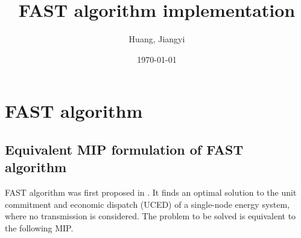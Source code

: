 \documentclass{article}
\title{FAST algorithm implementation}
\author{Huang, Jiangyi}
\date{\today}
\begin{document}
\maketitle

\section{FAST algorithm}

\subsection{Equivalent MIP formulation of FAST algorithm}
FAST algorithm was first proposed in \cite{Aonghus2014_FAST}. It finds an optimal solution to the unit commitment and economic dispatch (UCED) of a single-node energy system, where no transmission is considered. The problem to be solved is equivalent to the following MIP. 
\end{document}
